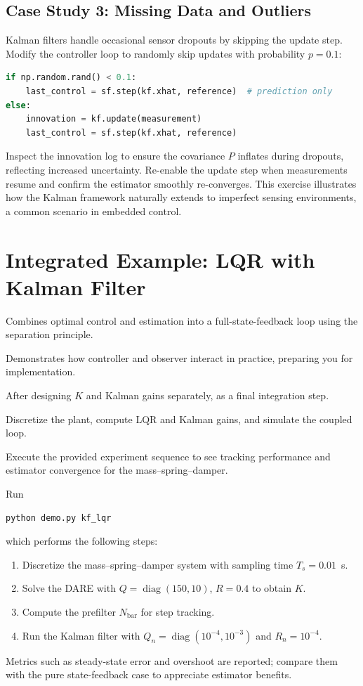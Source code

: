 \subsection{Case Study 3: Missing Data and Outliers}
Kalman filters handle occasional sensor dropouts by skipping the update step. Modify the controller loop to randomly skip updates with probability $p = 0.1$:
\begin{lstlisting}[language=python]
if np.random.rand() < 0.1:
    last_control = sf.step(kf.xhat, reference)  # prediction only
else:
    innovation = kf.update(measurement)
    last_control = sf.step(kf.xhat, reference)
\end{lstlisting}
Inspect the innovation log to ensure the covariance $P$ inflates during dropouts, reflecting increased uncertainty. Re-enable the update step when measurements resume and confirm the estimator smoothly re-converges. This exercise illustrates how the Kalman framework naturally extends to imperfect sensing environments, a common scenario in embedded control.


\section{Integrated Example: LQR with Kalman Filter}
\begin{beginnerguide}
    \item[\textbf{What?}] Combines optimal control and estimation into a full-state-feedback loop using the separation principle.
    \item[\textbf{Why?}] Demonstrates how controller and observer interact in practice, preparing you for implementation.
    \item[\textbf{When?}] After designing $K$ and Kalman gains separately, as a final integration step.
    \item[\textbf{How?}] Discretize the plant, compute LQR and Kalman gains, and simulate the coupled loop.
    \item[\textbf{Example}] Execute the provided experiment sequence to see tracking performance and estimator convergence for the mass--spring--damper.
\end{beginnerguide}
Run
\begin{lstlisting}[language=bash]
python demo.py kf_lqr
\end{lstlisting}
which performs the following steps:
\begin{enumerate}[leftmargin=*]
    \item Discretize the mass--spring--damper system with sampling time $T_s = 0.01$~s.
    \item Solve the DARE with $Q = \operatorname{diag}(150, 10)$, $R = 0.4$ to obtain $K$.
    \item Compute the prefilter $N_{\text{bar}}$ for step tracking.
    \item Run the Kalman filter with $Q_n = \operatorname{diag}(10^{-4}, 10^{-3})$ and $R_n = 10^{-4}$.
\end{enumerate}
Metrics such as steady-state error and overshoot are reported; compare them with the pure state-feedback case to appreciate estimator benefits.

